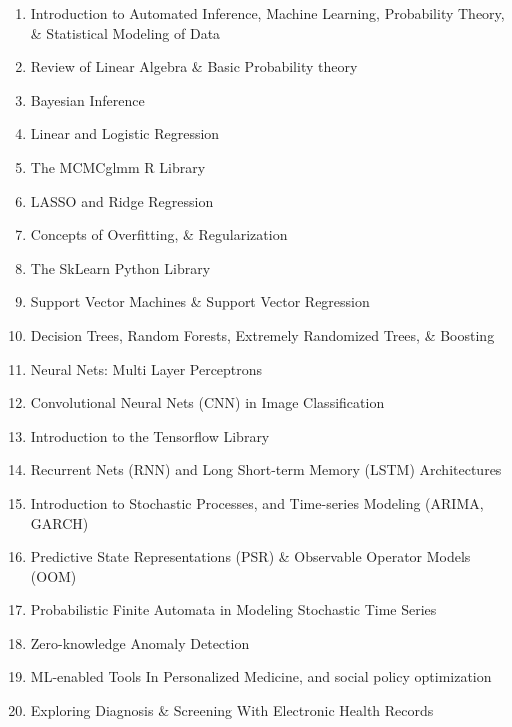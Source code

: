 \documentclass[10pt,onecolumn,compsoc]{IEEEtran}
\begin{document}
\begin{enumerate}\bf\sffamily\fontsize{9}{11}\selectfont
\COLA
\item Introduction to Automated Inference, Machine Learning, Probability Theory, \& Statistical Modeling of Data
\COLB
\item Review of Linear Algebra \&  Basic Probability theory
\item Bayesian Inference 
\item Linear and Logistic Regression 
\item The MCMCglmm R Library
\item LASSO and Ridge Regression  
\item Concepts of Overfitting, \& Regularization
\COLA
\item The SkLearn Python Library
\item Support Vector Machines \& Support Vector Regression
\item Decision Trees, Random Forests, Extremely Randomized Trees, \& Boosting 
\COLB
\item Neural Nets: Multi Layer Perceptrons
\item Convolutional Neural Nets (CNN)  in Image Classification
\item Introduction to the Tensorflow Library 
\item Recurrent Nets (RNN) and Long Short-term Memory (LSTM) Architectures 
\COLA
\item Introduction to Stochastic Processes, and Time-series Modeling (ARIMA, GARCH)
\item Predictive State Representations (PSR) \& Observable Operator Models (OOM)
\item Probabilistic Finite Automata in Modeling Stochastic Time Series
\COLB
\item Zero-knowledge Anomaly Detection 
\item ML-enabled Tools In Personalized Medicine, and social policy optimization
\item Exploring Diagnosis \& Screening With Electronic Health Records
\end{enumerate}

\renewcommand\refname{Texts}
\fontsize{7}{9}\selectfont
\nocite{*}


\end{document}
